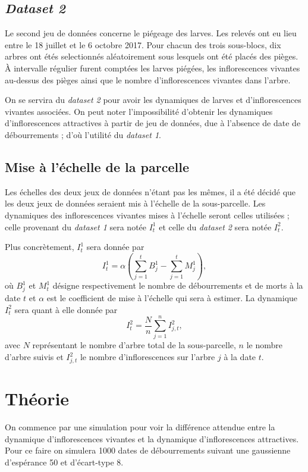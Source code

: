 \documentclass[a4paper, 11pt]{article}
\begin{document}
\subsection{\textit{Dataset 2}}

Le second jeu de données concerne le piégeage des larves. Les relevés ont eu lieu entre le 18 juillet et le 6 octobre 2017. Pour chacun des trois sous-blocs, dix arbres ont étés selectionnés aléatoirement sous lesquels ont été placés des pièges. À intervalle régulier furent comptées les larves piégées, les inflorescences vivantes au-dessus des pièges ainsi que le nombre d'inflorescences vivantes dans l'arbre.

On se servira du \textit{dataset 2} pour avoir les dynamiques de larves et d'inflorescences vivantes associées. On peut noter l'impossibilité d'obtenir les dynamiques d'inflorescences attractives à partir de jeu de données, due à l'absence de date de débourrements ; d'où l'utilité du \textit{dataset 1}.

\subsection{Mise à l'échelle de la parcelle}

Les échelles des deux jeux de données n'étant pas les mêmes, il a été décidé que les deux jeux de données seraient mis à l'échelle de la sous-parcelle. Les dynamiques des inflorescences vivantes mises à l'échelle seront celles utilisées ; celle provenant du \textit{dataset 1} sera notée $I_t^1$ et celle du \textit{dataset 2} sera notée $I_t^2$.

Plus concrètement, $I_t^1$ sera donnée par
$$I_t^1 = \alpha\left( \sum_{j=1}^t B_j^1 - \sum_{j=1}^t M_j^1 \right),$$
où $B_j^1$ et $M_t^1$ désigne respectivement le nombre de débourrements et de morts à la date $t$ et $\alpha$ est le coefficient de mise à l'échelle qui sera à estimer. La dynamique $I_t^2$ sera quant à elle donnée par
$$I_t^2 = \frac{N}{n}\sum_{j=1}^n I_{j, t}^2,$$
avec $N$ représentant le nombre d'arbre total de la sous-parcelle, $n$ le nombre d'arbre suivis et $I_{j, t}^2$ le nombre d'inflorescences sur l'arbre $j$ à la date $t$.

\section{Théorie}

On commence par une simulation pour voir la différence attendue entre la dynamique d'inflorescences vivantes et la dynamique d'inflorescences attractives. Pour ce faire on simulera 1000 dates de débourrements suivant une gaussienne d'espérance 50 et d'écart-type 8.
\end{document}

